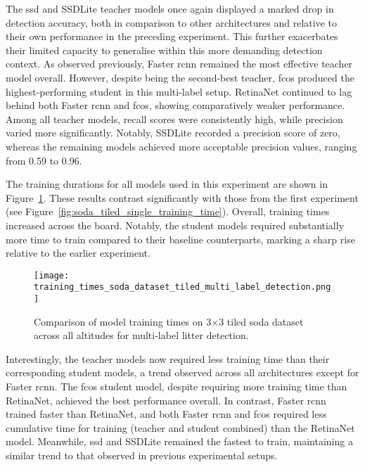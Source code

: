 The \gls{ssd} and SSDLite teacher models once again displayed a marked drop in detection accuracy, both in comparison to other architectures and relative to their own performance in the preceding experiment. This further exacerbates their limited capacity to generalise within this more demanding detection context. As observed previously, Faster \gls{rcnn} remained the most effective teacher model overall. However, despite being the second-best teacher, \gls{fcos} produced the highest-performing student in this multi-label setup. RetinaNet continued to lag behind both Faster \gls{rcnn} and \gls{fcos}, showing comparatively weaker performance.
Among all teacher models, recall scores were consistently high, while precision varied more significantly. Notably, SSDLite recorded a precision score of zero, whereas the remaining models achieved more acceptable precision values, ranging from 0.59 to 0.96.

The training durations for all models used in this experiment are shown in Figure~\ref{fig:soda_tiled_multi_training_time}. These results contrast significantly with those from the first experiment (see Figure~\ref{fig:soda_tiled_single_training_time}). Overall, training times increased across the board. Notably, the student models required substantially more time to train compared to their baseline counterparts, marking a sharp rise relative to the earlier experiment.

\begin{figure}[!ht]
    \centering
    \texttt{[image: training\_times\_soda\_dataset\_tiled\_multi\_label\_detection.png]}
    \caption{Comparison of model training times on 3$\times$3 tiled \gls{soda} dataset across all altitudes for multi-label litter detection.}
    \label{fig:soda_tiled_multi_training_time}
\end{figure}

Interestingly, the teacher models now required less training time than their corresponding student models, a trend observed across all architectures except for Faster \gls{rcnn}. The \gls{fcos} student model, despite requiring more training time than RetinaNet, achieved the best performance overall. In contrast, Faster \gls{rcnn} trained faster than RetinaNet, and both Faster \gls{rcnn} and \gls{fcos} required less cumulative time for training (teacher and student combined) than the RetinaNet model. Meanwhile, \gls{ssd} and SSDLite remained the fastest to train, maintaining a similar trend to that observed in previous experimental setups.

